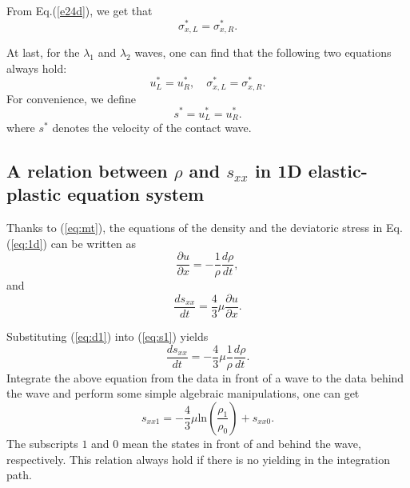 \documentclass[review]{elsarticle}
\begin{document}

From  Eq.(\ref{e24d}), we  get that
\begin{equation}   \label{e27a}
\sigma_{x,L} ^{\ast}=  \sigma_{x,R} ^{\ast}.
\end{equation}


At last, for the $\lambda_{1}$ and $\lambda_{2}$ waves, one can find
that the following two equations always hold:
\begin{equation}   \label{e28}
u_{L}^{\ast}=u_{R}^{\ast}, \quad
\sigma_{x,L}^{\ast}=\sigma_{x,R}^{\ast}.
\end{equation}
For convenience, we define
\begin{equation}\label{eq:contact}
  s^* = u_L^* = u_R^*. %
\end{equation}
where $s^*$ denotes the velocity of the contact wave.
\subsection{A relation between $\rho$ and $s_{xx}$ in 1D elastic-plastic  equation system}

Thanks to (\ref{eq:mt}), the equations of the density and the deviatoric stress in Eq.(\ref{eq:1d}) can be written as
  \begin{equation}\label{eq:d1}
    \frac{\partial u}{\partial x} = -\frac{1}{\rho}\frac{d\rho}{dt},
  \end{equation}
  and
  \begin{equation}\label{eq:s1}
    \frac{ds_{xx}}{dt}=\frac{4}{3}\mu\frac{\partial u}{\partial x}.
  \end{equation}

  Substituting (\ref{eq:d1}) into (\ref{eq:s1}) yields
  \begin{equation}
    \frac{ds_{xx}}{dt}=-\frac{4}{3}\mu \frac{1}{\rho}\frac{d\rho}{dt}.
\end{equation}
Integrate the above equation from the data in front of a wave to the data behind the wave and perform some simple algebraic manipulations, one can get
\begin{equation}\label{eq:rhosxx}
  s_{xx1}=-\frac{4}{3}\mu\text{ln}(\frac{\rho_{1}}{\rho_{0}})+s_{xx0}.
\end{equation}
The subscripts $1$ and $0$ mean the states in front of and behind the wave, respectively.
This relation always hold if there is no yielding in the integration path.
\end{document}
